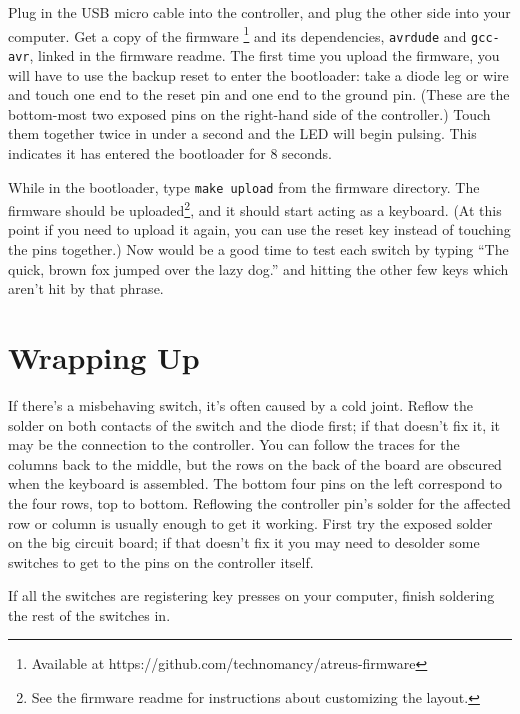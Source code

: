 \documentclass{article}
\begin{document}
Plug in the USB micro cable into the controller, and plug the other
side into your computer. Get a copy of the
firmware \footnote{Available at
  https://github.com/technomancy/atreus-firmware} and its
dependencies, \texttt{avrdude} and \texttt{gcc-avr}, linked in the
firmware readme. The first time you upload the firmware, you will have
to use the backup reset to enter the bootloader: take a diode leg or
wire and touch one end to the reset pin and one end to the ground
pin. (These are the bottom-most two exposed pins on the right-hand
side of the controller.) Touch them together twice in under a second
and the LED will begin pulsing. This indicates it has entered the
bootloader for 8 seconds.

\vspace{1em}

While in the bootloader, type \texttt{make upload} from the firmware
directory. The firmware should be uploaded\footnote{See the firmware
  readme for instructions about customizing the layout.}, and it
should start acting as a keyboard. (At this point if you need to
upload it again, you can use the reset key instead of touching the
pins together.) Now would be a good time to test each switch by typing
``The quick, brown fox jumped over the lazy dog.'' and hitting the
other few keys which aren't hit by that phrase.

\section{Wrapping Up}

If there's a misbehaving switch, it's often caused by a cold
joint. Reflow the solder on both contacts of the switch and the diode
first; if that doesn't fix it, it may be the connection to the
controller. You can follow the traces for the columns back to the
middle, but the rows on the back of the board are obscured when the
keyboard is assembled. The bottom four pins on the left correspond to
the four rows, top to bottom. Reflowing the controller pin's solder
for the affected row or column is usually enough to get it
working. First try the exposed solder on the big circuit board; if that
doesn't fix it you may need to desolder some switches to get to the
pins on the controller itself.

\vspace{1em}

If all the switches are registering key presses on your computer,
finish soldering the rest of the switches in.
\end{document}
